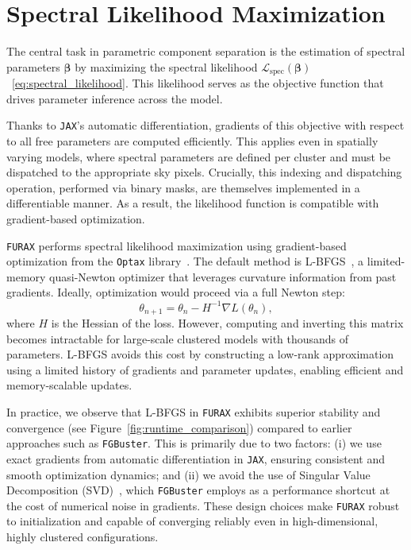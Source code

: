 \documentclass[fleqn,usenatbib]{mnras}
\begin{document}
\section{Spectral Likelihood Maximization}

The central task in parametric component separation is the estimation of spectral parameters \( \boldsymbol{\beta} \) by maximizing the spectral likelihood \( \mathcal{L}_{\mathrm{spec}}(\boldsymbol{\beta}) \)~\eqref{eq:spectral_likelihood}. This likelihood serves as the objective function that drives parameter inference across the model.

Thanks to \texttt{JAX}'s automatic differentiation, gradients of this objective with respect to all free parameters are computed efficiently. This applies even in spatially varying models, where spectral parameters are defined per cluster and must be dispatched to the appropriate sky pixels. Crucially, this indexing and dispatching operation, performed via binary masks, are themselves implemented in a differentiable manner. As a result, the likelihood function is compatible with gradient-based optimization.

\texttt{FURAX} performs spectral likelihood maximization using gradient-based optimization from the \texttt{Optax} library~\citep{optax}. The default method is L-BFGS~\citep{Liu1989}, a limited-memory quasi-Newton optimizer that leverages curvature information from past gradients. Ideally, optimization would proceed via a full Newton step:
\begin{equation}
    \theta_{n+1} = \theta_n - H^{-1} \nabla L(\theta_n),
\end{equation}
where \( H \) is the Hessian of the loss. However, computing and inverting this matrix becomes intractable for large-scale clustered models with thousands of parameters. L-BFGS avoids this cost by constructing a low-rank approximation using a limited history of gradients and parameter updates, enabling efficient and memory-scalable updates.

In practice, we observe that L-BFGS in \texttt{FURAX} exhibits superior stability and convergence (see Figure~\ref{fig:runtime_comparison}) compared to earlier approaches such as \texttt{FGBuster}. This is primarily due to two factors: (i) we use exact gradients from automatic differentiation in \texttt{JAX}, ensuring consistent and smooth optimization dynamics; and (ii) we avoid the use of Singular Value Decomposition (SVD)~\citep{SVD}, which \texttt{FGBuster} employs as a performance shortcut at the cost of numerical noise in gradients. These design choices make \texttt{FURAX} robust to initialization and capable of converging reliably even in high-dimensional, highly clustered configurations.
\end{document}
